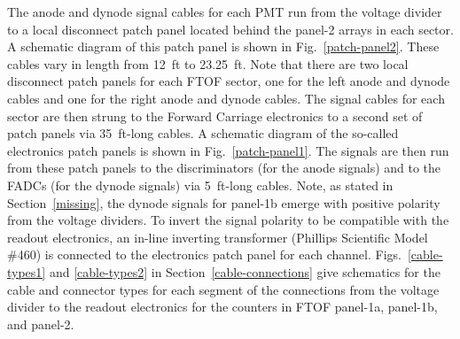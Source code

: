 \documentclass[12pt]{article}
\begin{document}
The anode and dynode signal cables for each PMT run from the voltage divider to a local 
disconnect patch panel located behind the panel-2 arrays in each sector. A schematic 
diagram of this patch panel is shown in Fig.~\ref{patch-panel2}. These cables vary in 
length from 12~ft to 23.25~ft. Note that there are two local disconnect patch panels for 
each FTOF sector, one for the left anode and dynode cables and one for the right anode 
and dynode cables. The signal cables for each sector are then strung to the Forward 
Carriage electronics to a second set of patch panels via 35~ft-long cables. A schematic 
diagram of the so-called electronics patch panels is shown in Fig.~\ref{patch-panel1}. 
The signals are then run from these patch panels to the discriminators (for the anode 
signals) and to the FADCs (for the dynode signals) via 5~ft-long cables. Note, as stated 
in Section~\ref{missing}, the dynode signals for panel-1b emerge with positive 
polarity from the voltage dividers. To invert the signal polarity to be compatible with 
the readout electronics, an in-line inverting transformer (Phillips Scientific Model 
\#460) is connected to the electronics patch panel for each channel. 
Figs.~\ref{cable-types1} and \ref{cable-types2} in Section~\ref{cable-connections} give 
schematics for the cable and connector types for each segment of the connections from 
the voltage divider to the readout electronics for the counters in FTOF panel-1a, 
panel-1b, and panel-2.
\end{document}
